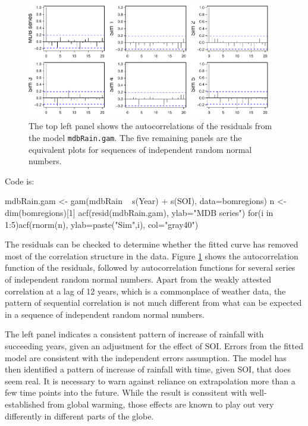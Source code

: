 \documentclass{tufte-book}\usepackage[]{graphicx}\usepackage[]{color}
\newcommand{\txtt}[1]{\texttt{#1}}
\begin{document}
\begin{figure}
\begin{Schunk}


\centerline{\includegraphics[width=0.97\textwidth]{figs/12-ar1sims-1} }

\end{Schunk}
\caption{The top left panel shows the autocorrelations of the
  residuals from the model \txtt{mdbRain.gam}.  The five remaining
  panels are the equivalent plots for sequences of independent random
  normal numbers.}\label{fig:ar1sims}
\end{figure}

Code is:
\begin{Schunk}
\begin{Sinput}
mdbRain.gam <- gam(mdbRain ~ s(Year) + s(SOI),
                   data=bomregions)
n <-  dim(bomregions)[1]
acf(resid(mdbRain.gam), ylab="MDB series")
for(i in 1:5)acf(rnorm(n), ylab=paste("Sim",i),
                 col="gray40")
\end{Sinput}
\end{Schunk}

The residuals can be checked to determine whether the fitted curve
has removed most of the correlation structure in the data.
Figure \ref{fig:ar1sims} shows the autocorrelation function of the
residuals, followed by autocorrelation functions for several series of
independent random normal numbers.  Apart from the weakly attested
correlation at a lag of 12 years, which is a commonplace of weather
data, the pattern of sequential correlation is not much different from
what can be expected in a sequence of independent random normal
numbers.

The left panel indicates a consistent pattern of increase of rainfall
with succeeding years, given an adjustment for the effect of SOI.
Errors from the fitted model are consistent with the independent
errors assumption.  The model has then identified a pattern of
increase of rainfall with time, given SOI, that does seem real.  It is
necessary to warn against reliance on extrapolation more than a few
time points into the future. While the result is conssitent with
well-established from global warming, those effects are known to play
out very differently in different parts of the globe.
\end{document}
